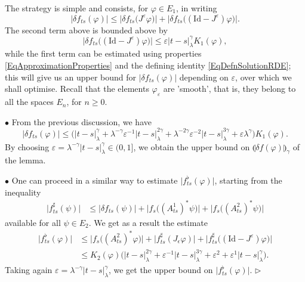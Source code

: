 \documentclass[11pt,a4paper]{amsart}
\renewcommand{\leq}{\leqslant}
\renewcommand{\geq}{\geqslant}
\newcommand{\ssk}{\smallskip}
\numberwithin{equation}{section} %
\newenvironment{Dem}{%
    \begin{list}{\hspace{0.5cm}{\sc Proof --}}{%
        \setlength{\topsep}{0pt}%
        \setlength{\leftmargin}{0pt}%
        \setlength{\rightmargin}{0pt}%
        \setlength{\listparindent}{0pt}%
        \setlength{\itemindent}{0pt}%
        \setlength{\parsep}{0pt}%
        \addtolength{\leftmargin}{20pt}%
        \addtolength{\rightmargin}{0pt}%
    } \item }{\hfill{\space $\rhd$}\end{list}\smallskip}
\begin{document}
\begin{Dem}
The strategy is simple and consists, for $\varphi\in E_1$, in writing
$$
\big|\delta f_{ts}(\varphi)\big| \leq \Big|\delta f_{ts}\big( J^\varepsilon\varphi\big)\Big| + \Big|\delta f_{ts}\big((\textrm{Id} - J^\varepsilon)\varphi\big)\Big|.
$$
The second term above is bounded above by 
$$
\Big|\delta f_{ts}\big((\textrm{Id} - J^\varepsilon)\varphi\big)\Big| \leq \varepsilon |t-s|_\lambda^\gamma K_1(\varphi),
$$ 
while the first term can be estimated using properties \eqref{EqApproximationProperties} and the defining identity \eqref{EqDefnSolutionRDE}; this will give us an upper bound for $\big|\delta f_{ts}(\varphi)\big|$ depending on $\varepsilon$, over which we shall optimise. Recall that the elements $\varphi_\varepsilon$  are 'smooth', that is, they belong to all the spaces $E_n$, for $n\geq 0$.

\medskip

$\bullet$ From the previous discussion, we have
\begin{equation*}
\Big| \delta f_{ts} (\varphi) \Big| \leq \Big(|t-s|^\gamma_\lambda + \lambda^{-\gamma}\varepsilon^{-1}|t-s|^{2\gamma}_\lambda  + \lambda^{-2\gamma} \varepsilon^{-2}|t-s|^{3\gamma}_\lambda  + \varepsilon\lambda^{\gamma}\Big) K_1(\varphi).
\end{equation*}
By choosing $\varepsilon = \lambda^{-\gamma} | t - s |_\lambda^\gamma \in(0,1]$, we obtain the upper bound on $\llparenthesis \delta f(\varphi) \rrparenthesis_\gamma$ of the lemma.

\ssk

$\bullet$ One can proceed in a similar way to estimate $\big|f^\flat_{ts}(\varphi)\big|$, starting from the inequality
\begin{equation*}
\begin{split}
\big| f^\sharp_{ts}(\psi)\big| &\leq \big| \delta f_{ts}(\psi)\big| + \Big| f_s\big((A^1_{ts})^*\psi\big)\Big| + \Big| f_s\big((A^2_{ts})^*\psi\big)\Big| 
\end{split}
\end{equation*}
available for all $\psi\in E_2$. We get as a result the estimate
\begin{equation*}
\begin{split}
\big| f^\flat_{ts} (\varphi) \big| &\leq \Big| f_s\big((A^2_{ts})^*\varphi\big)\Big| + \Big|f^\sharp_{ts}(J_\epsilon \varphi)\Big| + \Big|f^\sharp_{ts}\big((\textrm{Id} - J^\varepsilon)\varphi\big)\Big|  \\
&\leq K_2(\varphi) \Big(|t-s|_\lambda^{2\gamma} + \varepsilon^{-1}|t-s|_\lambda^{3\gamma}+ \varepsilon^{2} +  \varepsilon^{1}|t-s|_\lambda^{\gamma}\Big).
\end{split}
\end{equation*}
Taking again $\varepsilon = \lambda^{-\gamma} |t-s|^\gamma_\lambda$, we get the upper bound on $\big|f^\flat_{ts}(\varphi)\big|$.
\end{Dem}
\end{document}

